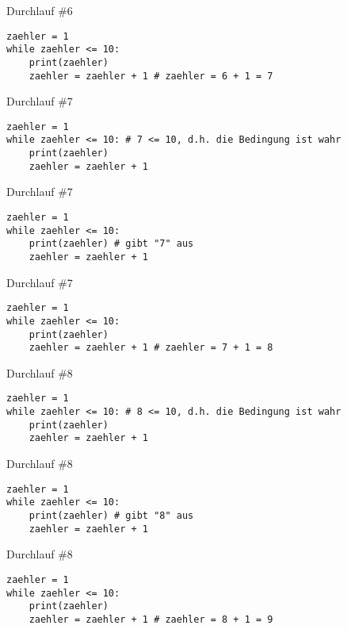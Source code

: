 \documentclass{\VorlagenPfad/coderdojokabeamer}
\begin{document}
\begin{frame}[fragile]{Durchlauf \#6}
	\begin{verbatim}
zaehler = 1
while zaehler <= 10:
	print(zaehler)
	zaehler = zaehler + 1 # zaehler = 6 + 1 = 7
\end{verbatim}
\end{frame}


\begin{frame}[fragile]{Durchlauf \#7}
	\begin{verbatim}
zaehler = 1
while zaehler <= 10: # 7 <= 10, d.h. die Bedingung ist wahr
	print(zaehler) 
	zaehler = zaehler + 1 
	\end{verbatim}
\end{frame}

\begin{frame}[fragile]{Durchlauf \#7}
	\begin{verbatim}
zaehler = 1
while zaehler <= 10: 
	print(zaehler) # gibt "7" aus
	zaehler = zaehler + 1 
	\end{verbatim}
\end{frame}

\begin{frame}[fragile]{Durchlauf \#7}
	\begin{verbatim}
zaehler = 1
while zaehler <= 10: 
	print(zaehler)
	zaehler = zaehler + 1 # zaehler = 7 + 1 = 8
	\end{verbatim}
\end{frame}



\begin{frame}[fragile]{Durchlauf \#8}
	\begin{verbatim}
zaehler = 1
while zaehler <= 10: # 8 <= 10, d.h. die Bedingung ist wahr
	print(zaehler)
	zaehler = zaehler + 1
	\end{verbatim}
\end{frame}

\begin{frame}[fragile]{Durchlauf \#8}
	\begin{verbatim}
zaehler = 1
while zaehler <= 10:
	print(zaehler) # gibt "8" aus
	zaehler = zaehler + 1
	\end{verbatim}
\end{frame}

\begin{frame}[fragile]{Durchlauf \#8}
	\begin{verbatim}
zaehler = 1
while zaehler <= 10:
	print(zaehler)
	zaehler = zaehler + 1 # zaehler = 8 + 1 = 9
	\end{verbatim}
\end{frame}
\end{document}
